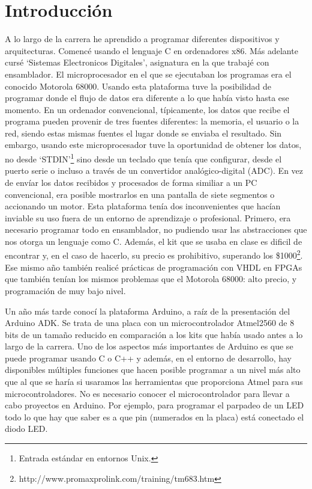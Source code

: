 

\section{Introducción}
A lo largo de la carrera he aprendido a programar diferentes dispositivos y arquitecturas. Comencé usando el lenguaje C en ordenadores x86. Más adelante cursé `Sistemas Electronicos Digitales', asignatura en la que trabajé con ensamblador. El microprocesador en el que se ejecutaban los programas era el conocido Motorola 68000. Usando esta plataforma tuve la posibilidad de programar donde el flujo de datos era diferente a lo que había visto hasta ese momento. En un ordenador convencional, típicamente, los datos que recibe el programa pueden provenir de tres fuentes diferentes: la memoria, el usuario o la red, siendo estas mismas fuentes el lugar donde se enviaba el resultado. Sin embargo, usando este microprocesador tuve la oportunidad de obtener los datos, no desde `STDIN'\footnote{Entrada estándar en entornos Unix.} sino desde un teclado que tenía que configurar, desde el puerto serie o incluso a través de un convertidor analógico-digital (ADC). En vez de envíar los datos recibidos y procesados de forma similiar a un PC convencional, era posible mostrarlos en una pantalla de siete segmentos o accionando un motor. Esta plataforma tenía dos inconvenientes que hacían inviable su uso fuera de un entorno de aprendizaje o profesional. Primero, era necesario programar todo en ensamblador, no pudiendo usar las abstracciones que nos otorga un lenguaje como C. Además, el kit que se usaba en clase es dificil de encontrar y, en el caso de hacerlo, su precio es prohibitivo, superando los \$1000\footnote{http://www.promaxprolink.com/training/tm683.htm}. Ese mismo año también realicé prácticas de programación con VHDL en FPGAs que también tenían los mismos problemas que el Motorola 68000: alto precio, y programación de muy bajo nivel.

Un año más tarde conocí la plataforma Arduino, a raíz de la presentación del Arduino ADK. Se trata de una placa con un microcontrolador Atmel2560 de 8 bits de un tamaño reducido en comparación a los kits que había usado antes a lo largo de la carrera. Uno de los aspectos más importantes de Arduino es que se puede programar usando C o C++ y además, en el entorno de desarrollo, hay disponibles múltiples funciones que hacen posible programar a un nivel más alto que al que se haría si usaramos las herramientas que proporciona Atmel para sus microcontroladores. No es necesario conocer el microcontrolador para llevar a cabo proyectos en Arduino. Por ejemplo, para programar el parpadeo de un LED todo lo que hay que saber es a que pin (numerados en la placa) está conectado el diodo LED.

